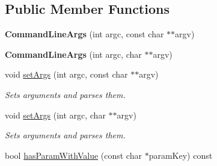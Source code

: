 \subsection*{Public Member Functions}
\begin{DoxyCompactItemize}
\item 
{\bfseries Command\+Line\+Args} (int argc, const char $\ast$$\ast$argv)\hypertarget{classel_1_1base_1_1utils_1_1CommandLineArgs_a9872b14450e9cd1c1bd96227743c083b}{}\label{classel_1_1base_1_1utils_1_1CommandLineArgs_a9872b14450e9cd1c1bd96227743c083b}

\item 
{\bfseries Command\+Line\+Args} (int argc, char $\ast$$\ast$argv)\hypertarget{classel_1_1base_1_1utils_1_1CommandLineArgs_a297b31b31829d9545d6e808f4be9195c}{}\label{classel_1_1base_1_1utils_1_1CommandLineArgs_a297b31b31829d9545d6e808f4be9195c}

\item 
void \hyperlink{classel_1_1base_1_1utils_1_1CommandLineArgs_a2d59b4184e0a6a314ef1c9a4c6d946e6}{set\+Args} (int argc, const char $\ast$$\ast$argv)\hypertarget{classel_1_1base_1_1utils_1_1CommandLineArgs_a2d59b4184e0a6a314ef1c9a4c6d946e6}{}\label{classel_1_1base_1_1utils_1_1CommandLineArgs_a2d59b4184e0a6a314ef1c9a4c6d946e6}

\begin{DoxyCompactList}\small\item\em Sets arguments and parses them. \end{DoxyCompactList}\item 
void \hyperlink{classel_1_1base_1_1utils_1_1CommandLineArgs_af88a16e6ce7b5d48f9679f304367b27a}{set\+Args} (int argc, char $\ast$$\ast$argv)\hypertarget{classel_1_1base_1_1utils_1_1CommandLineArgs_af88a16e6ce7b5d48f9679f304367b27a}{}\label{classel_1_1base_1_1utils_1_1CommandLineArgs_af88a16e6ce7b5d48f9679f304367b27a}

\begin{DoxyCompactList}\small\item\em Sets arguments and parses them. \end{DoxyCompactList}\item 
bool \hyperlink{classel_1_1base_1_1utils_1_1CommandLineArgs_acc9fa8eeed2deecffb6019173de5ab48}{has\+Param\+With\+Value} (const char $\ast$param\+Key) const \hypertarget{classel_1_1base_1_1utils_1_1CommandLineArgs_acc9fa8eeed2deecffb6019173de5ab48}{}\label{classel_1_1base_1_1utils_1_1CommandLineArgs_acc9fa8eeed2deecffb6019173de5ab48}


\end{DoxyCompactItemize}
